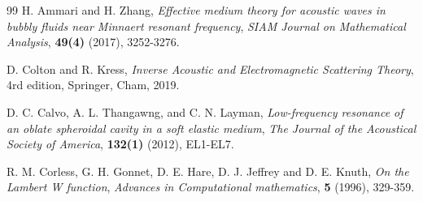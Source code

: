 \documentclass[11pt,reqno,twoside]{amsart}
\theoremstyle{definition}
\theoremstyle{remark}
\numberwithin{equation}{section}
\begin{document}
\begin{thebibliography}{99}
	H. Ammari and  H. Zhang, {\it Effective medium theory for acoustic waves in bubbly fluids near Minnaert resonant frequency}, {\em SIAM Journal on Mathematical Analysis}, {\bf 49(4)} (2017), 3252-3276.
	
	
	
	
	
	
	
	
	
	
	
	
	D. Colton and R. Kress, {\it Inverse Acoustic and Electromagnetic Scattering Theory}, 4rd edition, Springer, Cham, 2019.
	
	D. C. Calvo, A. L. Thangawng, and C. N. Layman, {\it Low-frequency resonance of an oblate spheroidal cavity in a soft elastic medium}, {\em The Journal of the Acoustical Society of America}, {\bf 132(1)} (2012), EL1-EL7.
	
	R. M. Corless, G. H. Gonnet, D. E. Hare, D. J. Jeffrey and D. E. Knuth, {\it On the Lambert W function}, {\em Advances in Computational mathematics}, {\bf 5} (1996), 329-359.
	
	
	
	
	
	
	
	
	
	
	
	
	
	
	
	
	

\end{thebibliography}
\end{document}
